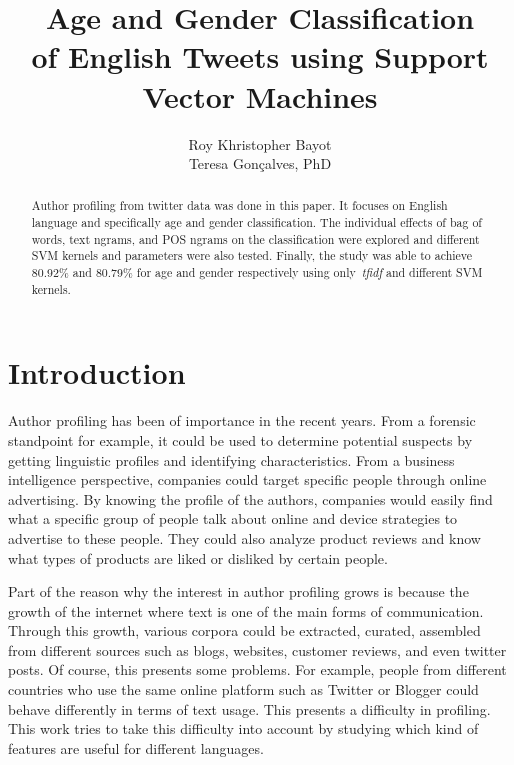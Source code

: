 \documentclass[a4paper]{llncs}
\begin{document}
\title{Age and Gender Classification\\
of English Tweets using Support Vector Machines}
\titlerunning{}
\author{Roy Khristopher Bayot\\Teresa Gonçalves, PhD}

\maketitle
\begin{abstract}
Author profiling from twitter data was done in this paper. It focuses on English language and specifically age and gender classification. The individual effects of bag of words, text ngrams, and POS ngrams on the classification were explored and different SVM kernels and parameters were also tested. Finally, the study was able to achieve 80.92\% and 80.79\% for age and gender respectively using only~\textit{tfidf} and different SVM kernels. 
\end{abstract}

\section{Introduction}
Author profiling has been of importance in the recent years. From a forensic standpoint for example, it could be used to determine potential suspects by getting linguistic profiles and identifying characteristics. From a business intelligence perspective, companies could target specific people through online advertising. By knowing the profile of the authors, companies would easily find what a specific group of people talk about online and device strategies to advertise to these people. They could also analyze product reviews and know what types of products are liked or disliked by certain people. 

Part of the reason why the interest in author profiling grows is because the growth of the internet where text is one of the main forms of communication. Through this growth, various corpora could be extracted, curated, assembled from different sources such as blogs, websites, customer reviews, and even twitter posts. Of course, this presents some problems. For example, people from different countries who use the same online platform such as Twitter or Blogger could behave differently in terms of text usage. This presents a difficulty in profiling. This work tries to take this difficulty into account by studying which kind of features are useful for different languages. 
\end{document}
